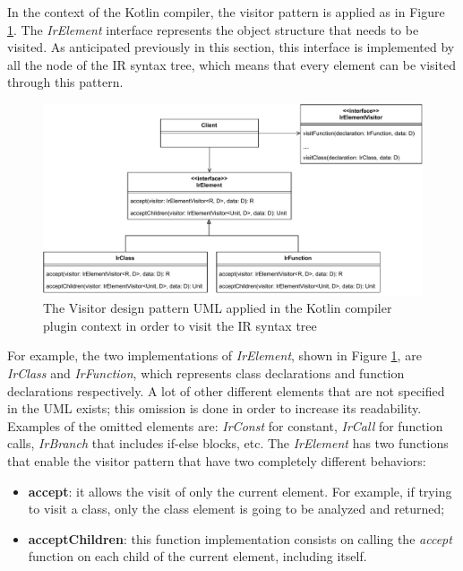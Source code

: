 In the context of the Kotlin compiler, the visitor pattern is applied as in Figure \ref{fig:visitor_uml_kotlin_compiler}. The \textit{IrElement} interface represents the object structure that needs to be visited. As anticipated previously in this section, this interface is implemented by all the node of the IR syntax tree, which means that every element can be visited through this pattern.\newline
\begin{figure}[!ht]
    \centering
    \includegraphics[scale=0.77]{document/chapters/2-metaprogramming/images/visitor_uml_kotlin_compiler.pdf}
    \caption{The Visitor design pattern UML applied in the Kotlin compiler plugin context in order to visit the IR syntax tree}
    \label{fig:visitor_uml_kotlin_compiler}
\end{figure}
For example, the two implementations of \textit{IrElement}, shown in Figure \ref{fig:visitor_uml_kotlin_compiler}, are \textit{IrClass} and \textit{IrFunction}, which represents class declarations and function declarations respectively. A lot of other different elements that are not specified in the UML exists; this omission is done in order to increase its readability. Examples of the omitted elements are: \textit{IrConst} for constant, \textit{IrCall} for function calls, \textit{IrBranch} that includes if-else blocks, etc.\newline
The \textit{IrElement} has two functions that enable the visitor pattern that have two completely different behaviors:
\begin{itemize}
    \item \textbf{accept}: it allows the visit of only the current element. For example, if trying to visit a class, only the class element is going to be analyzed and returned;
    \item \textbf{acceptChildren}: this function implementation consists on calling the \textit{accept} function on each child of the current element, including itself.
\end{itemize}
